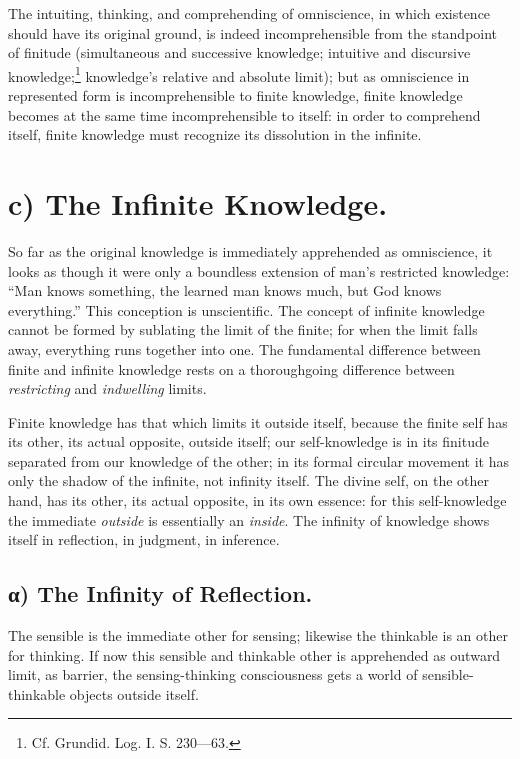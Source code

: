 \documentclass[12pt]{book}
\begin{document}
The intuiting, thinking, and comprehending of omniscience, in which
existence should have its original ground, is indeed
incomprehensible from the standpoint of finitude (simultaneous and
successive knowledge; intuitive and discursive
knowledge;\footnote{Cf. Grundid. Log. I. S. 230---63.} knowledge's
relative and absolute limit); but as omniscience in represented form
is incomprehensible to finite knowledge, finite knowledge becomes at
the same time incomprehensible to itself: in order to comprehend
itself, finite knowledge must recognize its dissolution in the
infinite.

\section*{c) The Infinite Knowledge.}

So far as the original knowledge is immediately apprehended as
omniscience, it looks as though it were only a boundless extension
of man's restricted knowledge: ``Man knows something, the learned
man knows much, but God knows everything.'' This conception is
unscientific. The concept of infinite knowledge cannot be formed by
sublating the limit of the finite; for when the limit falls away,
everything runs together into one. The fundamental difference
between finite and infinite knowledge rests on a thoroughgoing
difference between \emph{restricting} and \emph{indwelling} limits.

Finite knowledge has that which limits it outside itself, because
the finite self has its other, its actual opposite, outside itself;
our self-knowledge is in its finitude separated from our knowledge
of the other; in its formal circular movement it has only the shadow
of the infinite, not infinity itself. The divine self, on the other
hand, has its other, its actual opposite, in its own essence: for
this self-knowledge the immediate \emph{outside} is essentially an
\emph{inside}. The infinity of knowledge shows itself in reflection,
in judgment, in inference.

\subsection*{α) The Infinity of Reflection.}

The sensible is the immediate other for sensing; likewise the
thinkable is an other for thinking. If now this sensible and
thinkable other is apprehended as outward limit, as
barrier, the sensing-thinking consciousness gets a world of
sensible-thinkable objects outside itself.
\end{document}
